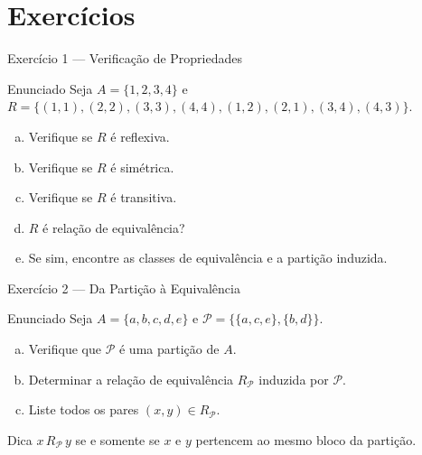 \documentclass[9pt]{beamer}
\begin{document}
\section{Exercícios}

\begin{frame}{Exercício 1 — Verificação de Propriedades}

\begin{block}{Enunciado}
Seja $A = \{1,2,3,4\}$ e $R = \{(1,1),(2,2),(3,3),(4,4),(1,2),(2,1),(3,4),(4,3)\}$.
\begin{enumerate}[(a)]
  \item Verifique se $R$ é reflexiva.
  \item Verifique se $R$ é simétrica.
  \item Verifique se $R$ é transitiva.
  \item $R$ é relação de equivalência?
  \item Se sim, encontre as classes de equivalência e a partição induzida.
\end{enumerate}
\end{block}

\end{frame}

\begin{frame}{Exercício 2 — Da Partição à Equivalência}

\begin{block}{Enunciado}
Seja $A = \{a,b,c,d,e\}$ e $\mathcal{P} = \{\{a,c,e\},\{b,d\}\}$.
\begin{enumerate}[(a)]
  \item Verifique que $\mathcal{P}$ é uma partição de $A$.
  \item Determinar a relação de equivalência $R_\mathcal{P}$ induzida por $\mathcal{P}$.
  \item Liste todos os pares $(x,y) \in R_\mathcal{P}$.
\end{enumerate}
\end{block}

\begin{block}{Dica}
$x\,R_\mathcal{P}\,y$ se e somente se $x$ e $y$ pertencem ao mesmo bloco da partição.
\end{block}

\end{frame}
\end{document}
